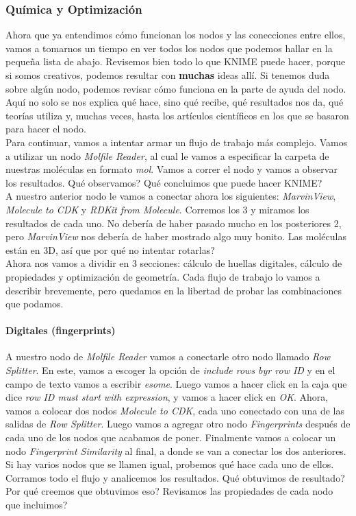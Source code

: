 \documentclass[10pt,letterpaper]{article}
\begin{document}
\subsubsection{Qu\'imica y Optimizaci\'on}
Ahora que ya entendimos c\'omo funcionan los nodos y las conecciones entre ellos, vamos a tomarnos un tiempo en ver todos los nodos que podemos hallar en la peque\~na lista de abajo. Revisemos bien todo lo que KNIME puede hacer, porque si somos creativos, podemos resultar con \textbf{muchas} ideas all\'i. Si tenemos duda sobre alg\'un nodo, podemos revisar c\'omo funciona en la parte de ayuda del nodo. Aqu\'i no solo se nos explica qu\'e hace, sino qu\'e recibe, qu\'e resultados nos da, qu\'e teor\'ias utiliza y, muchas veces, hasta los art\'iculos cient\'ificos en los que se basaron para hacer el nodo.\\

Para continuar, vamos a intentar armar un flujo de trabajo m\'as complejo. Vamos a utilizar un nodo \emph{Molfile Reader}, al cual le vamos a especificar la carpeta de nuestras mol\'eculas en formato \emph{mol}. Vamos a correr el nodo y vamos a observar los resultados. Qu\'e observamos? Qu\'e concluimos que puede hacer KNIME?\\

A nuestro anterior nodo le vamos a conectar ahora los siguientes: \emph{MarvinView}, \emph{Molecule to CDK} y \emph{RDKit from Molecule}. Corremos los 3 y miramos los resultados de cada uno. No deber\'ia de haber pasado mucho en los posteriores 2, pero \emph{MarvinView} nos deber\'ia de haber mostrado algo muy bonito. Las mol\'eculas est\'an en 3D, as\'i que por qu\'e no intentar rotarlas?\\

Ahora nos vamos a dividir en 3 secciones: c\'alculo de huellas digitales, c\'alculo de propiedades y optimizaci\'on de geometr\'ia. Cada flujo de trabajo lo vamos a describir brevemente, pero quedamos en la libertad de probar las combinaciones que podamos.\\

\paragraph{Digitales (fingerprints)}
A nuestro nodo de \emph{Molfile Reader} vamos a conectarle otro nodo llamado \emph{Row Splitter}. En este, vamos a escoger la opci\'on de \emph{include rows byr row ID} y en el campo de texto vamos a escribir \emph{esome}. Luego vamos a hacer click en la caja que dice \emph{row ID must start with expression}, y vamos a hacer click en \emph{OK}. Ahora, vamos a colocar dos nodos \emph{Molecule to CDK}, cada uno conectado con una de las salidas de \emph{Row Splitter}. Luego vamos a agregar otro nodo \emph{Fingerprints} despu\'es de cada uno de los nodos que acabamos de poner. Finalmente vamos a colocar un nodo \emph{Fingerprint Similarity} al final, a donde se van a conectar los dos anteriores. Si hay varios nodos que se llamen igual, probemos qu\'e hace cada uno de ellos. Corramos todo el flujo y analicemos los resultados. Qu\'e obtuvimos de resultado? Por qu\'e creemos que obtuvimos eso? Revisamos las propiedades de cada nodo que incluimos?
\end{document}
